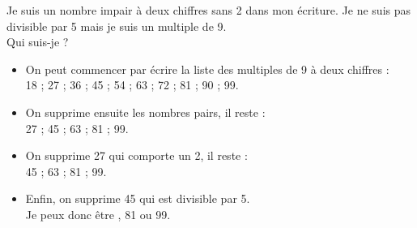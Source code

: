 \begin{exercice*}
    Je suis un nombre impair à deux chiffres sans 2 dans mon écriture. Je ne suis pas divisible par 5 mais je suis un multiple de 9. \\
    Qui suis-je ? 
\end{exercice*}

\begin{corrige}
\begin{itemize}
    \item On peut commencer par écrire la liste des multiples de 9 à deux chiffres : \\
        18 ; 27 ; 36 ; 45 ; 54 ; 63 ; 72 ; 81 ; 90 ; 99.
    \item On supprime ensuite les nombres pairs, il reste : \\
        27 ; 45 ; 63 ; 81 ; 99.
    \item On supprime 27 qui comporte un 2, il reste : \\
        45 ; 63 ; 81 ; 99. \\
    \item Enfin, on supprime 45 qui est divisible par 5. \\
        Je peux donc être {, 81 ou 99}.
\end{itemize}
\end{corrige}
